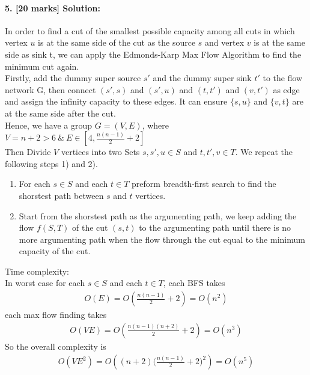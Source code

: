 \documentclass[a4paper]{scrartcl}
\begin{document}
\paragraph{5. [20 marks] Solution:}
\label{sec:Question 5}
In order to find a cut of the smallest possible capacity among all cuts in which vertex $u$ is at the same side of the cut as the source $s$ and vertex $v$ is at the same side as sink t, we can apply the Edmonds-Karp Max Flow Algorithm to find the minimum cut again.\\
Firstly, add the dummy super source $s'$ and the dummy super sink $t'$ to the flow network G, then connect $(s', s)$ and $(s', u)$ and $(t,t')$ and $(v, t')$ as edge and assign the infinity capacity to these edges. It can ensure $\{s,u\}$ and $\{v, t\}$ are at the same side after the cut.\\
Hence, we have a group $G=(V,E)$, where $V=n + 2 > 6\ \&\ E\in [4, \frac{n(n-1)}{2}+2]$\\
Then Divide $V$ vertices into two Sets $s, s',u \in S$ and $t, t',v \in T$. We repeat the following steps 1) and 2).
\begin{enumerate}[label=\arabic{*})]
  \item For each $s \in S$ and each $t \in T$ preform breadth-first search to find the shorstest path between $s$ and $t$ vertices.
  \item Start from the shorstest path as the argumenting path, we keep adding the flow $f(S,T)$ of the cut $(s,t)$ to the argumenting path until there is no more argumenting path when the flow through the cut equal to the minimum capacity of the cut.    
\end{enumerate}
Time complexity:\\
In worst case for each $s \in S$ and each $t \in T$, each BFS takes
\begin{align*}
  O(E)=O(\frac{n(n-1)}{2}+2)=O(n^2)
\end{align*}
each max flow finding takes
\begin{align*}
O(VE)=O(\frac{n(n-1)(n+2)}{2}+2)=O(n^3)
\end{align*}
So the overall complexity is
\begin{align*}
O(VE^2)=O((n+2)\big(\frac{n(n-1)}{2}+2\big)^2) = O(n^5)
\end{align*}
\end{document}
